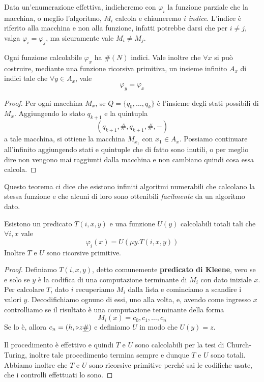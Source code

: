 Data un'enumerazione effettiva, indicheremo con $\varphi_i$ la
funzione parziale che la macchina, o meglio l'algoritmo, $M_i$
calcola e chiameremo $i$ \emph{indice}. L'indice è riferito
alla macchina e non alla funzione, infatti potrebbe darsi che
per $i \neq j$, valga $\varphi_i = \varphi_j$, ma sicuramente
vale $M_i \neq M_j$.

\begin{theorem} \label{th: padding lemma}
	Ogni funzione calcolabile $\varphi_x$ ha $\# (N)$ indici.
	Vale inoltre che $\forall x$ si può costruire, mediante una
	funzione ricorsiva primitiva, un insieme infinito $A_x$ di
	indici tale che $\forall y \in A_x$, vale
	\[ \varphi_y = \varphi_x \]
	\begin{proof}
		Per ogni macchina $M_x$, se $Q = \{ q_0, \dots, q_k \}$
		è l'insieme degli stati possibili di $M_x$. Aggiungendo
		lo stato $q_{k+1}$ e la quintupla
		\[ (q_{k+1}, \#, q_{k+1}, \#, -) \]
		a tale macchina, si ottiene la macchina $M_{x_1}$ con
		$x_1 \in A_x$. Possiamo continuare all'infinito
		aggiungendo stati e quintuple che di fatto sono inutili,
		o per meglio dire non vengono mai raggiunti dalla
		macchina e non cambiano quindi cosa essa calcola.
	\end{proof}
\end{theorem}

Questo teorema ci dice che esistono infiniti algoritmi
numerabili che calcolano la stessa funzione e che alcuni di
loro sono ottenibili \emph{facilmente} da un algoritmo dato.

\begin{theorem} \label{th: fn}
	Esistono un predicato $T(i, x, y)$ e una funzione $U(y)$
	calcolabili totali tali che $\forall i,x$ vale
	\[ \varphi_i(x) = U(\mu y . T (i, x, y)) \]
	Inoltre $T$ e $U$ sono ricorsive primitive.
	\begin{proof}
		Definiamo $T(i,x,y)$, detto comunemente
		\textbf{predicato di Kleene}, vero se e solo se $y$ è
		la codifica di una computazione terminante di $M_i$
		con dato iniziale $x$. Per calcolare $T$, dato $i$
		recuperiamo $M_i$ dalla lista e cominciamo a scandire
		i valori $y$. Decodifichiamo ognuno di essi, uno alla
		volta, e, avendo come ingresso $x$ controlliamo se il
		risultato è una computazione terminante della forma
		\[ M_i(x) = c_0, c_1, \dots, c_n \]
		Se lo è, allora $c_n = (h, \triangleright z \underline{\#})$ e
		definiamo $U$ in modo che $U(y) = z$.

		Il procedimento è effettivo e quindi $T$ e $U$ sono
		calcolabili per la tesi di Church-Turing, inoltre tale
		procedimento termina sempre e dunque $T$ e $U$ sono
		totali. Abbiamo inoltre che $T$ e $U$ sono ricorsive
		primitive perché sai le codifiche usate, che i controlli
		effettuati lo sono.
	\end{proof}
\end{theorem}

